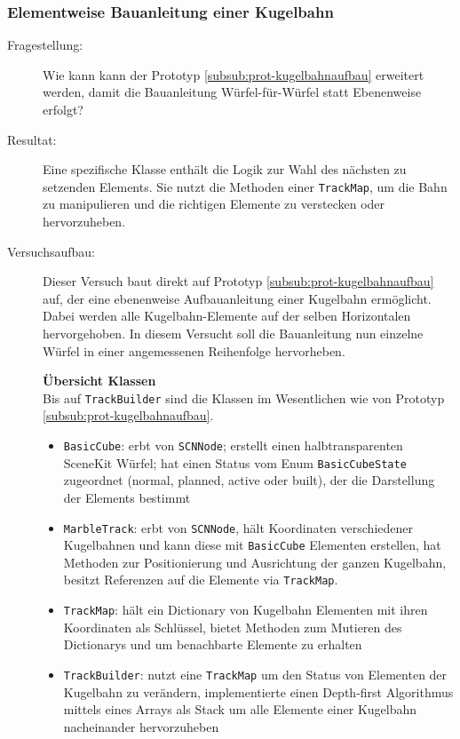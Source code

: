 \subsubsection{Elementweise Bauanleitung einer Kugelbahn}\label{subsub:prot-kugelbahnaufbau2}
\begin{description}
	\item[Fragestellung:] Wie kann kann der Prototyp \ref{subsub:prot-kugelbahnaufbau} erweitert werden, damit die Bauanleitung Würfel-für-Würfel statt Ebenenweise erfolgt?
	\item[Resultat:] Eine spezifische Klasse enthält die Logik zur Wahl des nächsten zu setzenden Elements. Sie nutzt die Methoden einer \texttt{TrackMap}, um die Bahn zu manipulieren und die richtigen Elemente zu verstecken oder hervorzuheben.
	\item[Versuchsaufbau:] Dieser Versuch baut direkt auf Prototyp \ref{subsub:prot-kugelbahnaufbau} auf, der eine ebenenweise Aufbauanleitung einer Kugelbahn ermöglicht. Dabei werden alle Kugelbahn-Elemente auf der selben Horizontalen hervorgehoben. In diesem Versucht soll die Bauanleitung nun einzelne Würfel in einer angemessenen Reihenfolge hervorheben.

	\textbf{Übersicht Klassen}\\
	Bis auf \texttt{TrackBuilder} sind die Klassen im Wesentlichen wie von Prototyp \ref{subsub:prot-kugelbahnaufbau}.
	\begin{itemize}
		\item \texttt{BasicCube}: erbt von \texttt{SCNNode}; erstellt einen halbtransparenten SceneKit Würfel; hat einen Status vom Enum \texttt{BasicCubeState} zugeordnet (normal, planned, active oder built), der die Darstellung der Elements bestimmt
		\item \texttt{MarbleTrack}: erbt von \texttt{SCNNode}, hält Koordinaten verschiedener Kugelbahnen und kann diese mit \texttt{BasicCube} Elementen erstellen, hat Methoden zur Positionierung und Ausrichtung der ganzen Kugelbahn, besitzt Referenzen auf die Elemente via \texttt{TrackMap}.
		\item \texttt{TrackMap}: hält ein Dictionary von Kugelbahn Elementen mit ihren Koordinaten als Schlüssel, bietet Methoden zum Mutieren des Dictionarys und um benachbarte Elemente zu erhalten
		\item \texttt{TrackBuilder}: nutzt eine \texttt{TrackMap} um den Status von Elementen der Kugelbahn zu verändern, implementierte einen Depth-first Algorithmus mittels eines Arrays als Stack um alle Elemente einer Kugelbahn nacheinander hervorzuheben
	\end{itemize}


\end{description}
